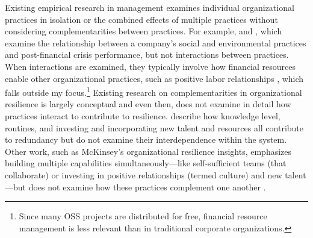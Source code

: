 \documentclass[12pt,notitlepage]{article}
\begin{document}
Existing empirical research in management examines individual organizational practices in isolation or the combined effects of multiple practices without considering complementarities between practices. 
For example, \cite{ortiz-de-mandojana_long-term_2016} and \cite{desjardine_bouncing_2019}, which examine the relationship between a company’s social and environmental practices and post-financial crisis performance, but not interactions between practices. 
When interactions are examined, they typically involve how financial resources enable other organizational practices, such as positive labor relationships \citep{gittell_relationships_2006}, which falls outside my focus.\footnote{Since many OSS projects are distributed for free, financial resource management is less relevant than in traditional corporate organizations.}
Existing research on complementarities in organizational resilience is largely conceptual and even then, does not examine in detail how practices interact to contribute to resilience. 
\cite{kendra_nyc_2003} describe how knowledge level, routines, and investing and incorporating new talent and resources all contribute to redundancy but do not examine their interdependence within the system.
Other work, such as McKinsey’s organizational resilience insights, emphasizes building multiple capabilities simultaneously—like self-sufficient teams (that collaborate) or investing in positive relationships (termed culture) and new talent—but does not examine how these practices complement one another \citep{maor_raising_2022}.
\end{document}
